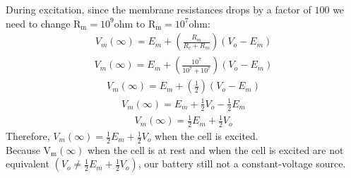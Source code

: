 \documentclass[11pt]{article}
\begin{document}
\begin{enumerate}[label=\arabic*.]
\begin{enumerate}[label=(\alph*)]
During excitation, since the membrane resistances drops by a factor of $100$ we need to change $\text{R}_\text{m} = 10^9 \text{ohm}$ to $\text{R}_\text{m} = 10^7 \text{ohm}$:
\begin{align*}
V_m(\infty) = E_m + \left(\frac{R_m} {R_e+ R_m}\right) \left(V_o - E_m\right)
\end{align*}
\begin{align*}
V_m(\infty) = E_m + \left(\frac{10^7} {10^7 + 10^7}\right) \left(V_o - E_m\right)
\end{align*}
\begin{align*}
V_m(\infty) = E_m + \left(\frac{1} {2}\right) \left(V_o - E_m\right)
\end{align*}
\begin{align*}
V_m(\infty) = E_m + \frac{1} {2} V_o - \frac{1} {2} E_m
\end{align*}
\begin{align*}
V_m(\infty) = \frac{1} {2} E_m + \frac{1} {2} V_o
\end{align*}
Therefore, $V_m(\infty) = \frac{1} {2} E_m + \frac{1} {2} V_o$ when the cell is excited.
\vspace*{1\baselineskip}
\\
Because $\text{V}_\text{m}(\infty)$ when the cell is at rest and when the cell is excited are not equivalent $\left(V_o \neq \frac{1} {2} E_m + \frac{1} {2} V_o\right)$, our battery still not a constant-voltage source.



\end{enumerate}






\end{enumerate}
\end{document}
